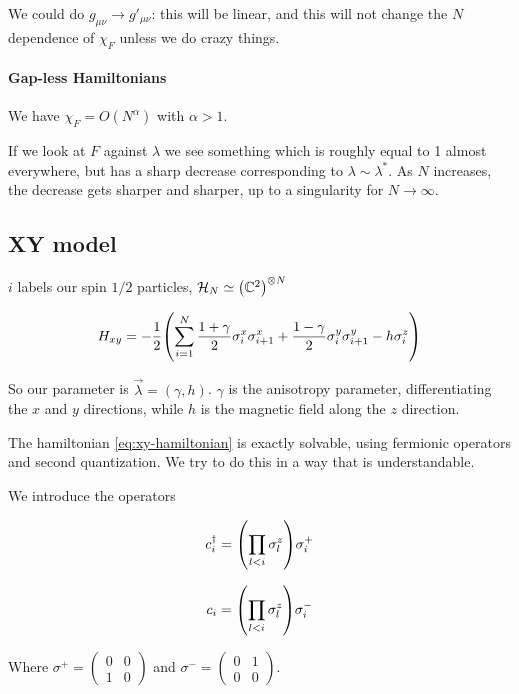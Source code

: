 \documentclass[main.tex]{subfiles}
\begin{document}
We could  do \(g_{\mu \nu} \rightarrow g' _{\mu \nu}\): this will be linear, and this will not change the \(N\) dependence of \(\chi_F\) unless we do crazy things.

\paragraph{Gap-less Hamiltonians}

We have \(\chi_F = O(N^\alpha) \) with \(\alpha>1\).

If we look at \(F\) against \(\lambda\) we see something which is roughly equal to 1 almost everywhere, but has a sharp decrease corresponding to \(\lambda \sim \lambda^*\). As \(N\) increases, the decrease gets sharper and sharper, up to a singularity for \(N \rightarrow \infty\).

\subsection{XY model}

\(i\) labels our spin \(1/2\) particles,  \(\mathcal{H}_N \simeq \qty(\mathbb{C}^2)^{\otimes N} \)

\begin{equation} \label{eq:xy-hamiltonian}
  H_{xy} = -\frac{1}{2} \qty(\sum _{i=1}   ^{N}
  \frac{1 + \gamma}{2} \sigma_i ^x \sigma_{i+1}^x
  +\frac{1-\gamma}{2} \sigma^y_i \sigma_{i+1}^y
  - h \sigma_i^{z} )
\end{equation}

So our parameter is \(\vec{\lambda} = (\gamma, h) \). \(\gamma\) is the anisotropy parameter, differentiating the \(x\) and \(y \) directions, while \(h\) is the magnetic field along the \(z\) direction.

The hamiltonian \eqref{eq:xy-hamiltonian} is exactly solvable, using fermionic operators and second quantization. We try to do this in a way that is understandable.

We introduce the operators

\begin{equation}
    c_i ^\dag = \qty(\prod _{l<i} \sigma_l^z) \sigma_i^+
\end{equation}

\begin{equation}
    c_i  = \qty(\prod _{l<i} \sigma_l^z) \sigma_i^-
\end{equation}

Where \(\sigma^+  = \begin{pmatrix}
    0 & 0 \\
    1 & 0
\end{pmatrix}\) and \(\sigma^-  = \begin{pmatrix}
    0 & 1 \\ 0 & 0
\end{pmatrix}\).
\end{document}
